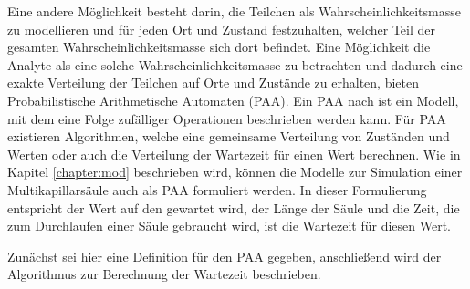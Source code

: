 Eine andere Möglichkeit besteht darin, die Teilchen als Wahrscheinlichkeitsmasse zu modellieren und für jeden Ort und Zustand festzuhalten, welcher Teil der gesamten Wahrscheinlichkeitsmasse sich dort befindet.
Eine Möglichkeit die Analyte als eine solche Wahrscheinlichkeitsmasse zu betrachten und dadurch eine exakte Verteilung der Teilchen auf Orte und Zustände zu erhalten, bieten Probabilistische Arithmetische Automaten (PAA).
Ein PAA nach \cite{MHKR} ist ein Modell, mit dem eine Folge zufälliger Operationen beschrieben werden kann. 
Für PAA existieren Algorithmen, welche eine gemeinsame Verteilung von Zuständen und Werten oder auch die Verteilung der Wartezeit für einen Wert berechnen. Wie in Kapitel \ref{chapter:mod} beschrieben wird, können die Modelle zur Simulation einer Multikapillarsäule auch als PAA formuliert werden. 
In dieser Formulierung entspricht der Wert auf den gewartet wird, der Länge der Säule und die Zeit, die zum Durchlaufen einer Säule gebraucht wird, ist die Wartezeit für diesen Wert. %

Zunächst sei hier eine Definition für den PAA gegeben, anschließend wird der Algorithmus zur Berechnung der Wartezeit beschrieben.


